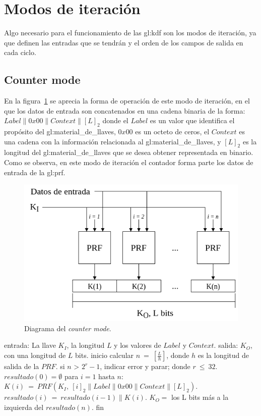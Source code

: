 \section{Modos de iteración}

Algo necesario para el funcionamiento de las \gls{gl:kdf} son los modos de
iteración, ya que definen las entradas que se tendrán y el orden de los campos
de salida en cada ciclo.

\subsection{Counter mode}
En la figura~\ref{diagrama_counter_mode} se aprecia la forma de operación de
este modo de iteración, en el que los datos de entrada son concatenados en una
cadena binaria de la forma: $Label \parallel 0x00 \parallel Context \parallel
{[L]}_2$ donde el $Label$ es un valor que identifica el propósito del
\gls{gl:material_de_llaves}, $0x00$ es un octeto de ceros, el $Context$ es una
cadena con la información relacionada al \gls{gl:material_de_llaves}, y
${[L]}_2$ es la longitud del \gls{gl:material_de_llaves} que se desea obtener
representada en binario. Como se observa, en este modo de iteración el
contador forma parte los datos de entrada de la \gls{gl:prf}.

\begin{figure}
  \begin{center}
    \includegraphics[width=0.75\linewidth]{diagramas/counter_mode}
    \caption{Diagrama del \textit{counter mode}.}
    \label{diagrama_counter_mode}
   \end{center}
\end{figure}

\begin{pseudocodigo}[caption={Funcionamiento del \textit{counter mode}.},
label={mi:1}]
    entrada:   La llave $K_I$, la longitud $L$ y los valores de $Label$ y $Context$.
    salida:    $K_O$, con una longitud de $L$ bits.
    inicio
      calcular $n\: =\: [\frac{L}{h}]$, donde $h$ es la longitud de salida de la $PRF$.
      si $n$ > $2^r-1$, indicar error y parar; donde $r\: \leq\: 32$.
      $resultado(0) = \emptyset$
      para $i=1$ hasta $n$:
        $K(i)\: =\: PRF(K_I,\: {[i]}_2 \parallel Label \parallel 0x00 \parallel Context \parallel {[L]}_2 )$.
        $resultado(i)\: =\: resultado(i-1) \parallel K(i)$.
      $K_O =$ los L bits más a la izquierda del $resultado(n)$.
    fin
\end{pseudocodigo}


